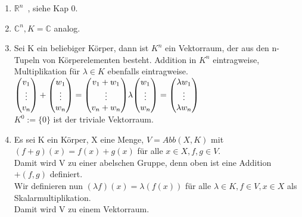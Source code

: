 \documentclass{article}
\newcommand{\lb}{\lambda}
\newcommand{\C}{\mathbb{C}}
\newcommand{\mRn}{$\mathbb{R}^n$\ }
\newcommand{\ve}[1]{{\begin{pmatrix}#1 \end{pmatrix}}}
\renewcommand{\v}{\ve}
\begin{document}
\begin{enumerate}
\item{\mRn, siehe Kap 0.}
\item{$\C^n, K = \C$ analog.}
\item{Sei K ein beliebiger Körper, dann ist $K^n$ ein Vektorraum, der aus den n-Tupeln von Körperelementen besteht. Addition in $K^n$ eintragweise, Multiplikation für $\lb \in K$ ebenfalls eintragweise.\\
$
\v{v_1\\ \vdots\\ v_n} + \v{w_1\\ \vdots\\ w_n} = \v{v_1 + w_1\\ \vdots \\ v_n + w_n}\\
\lb \v{w_1\\ \vdots\\ w_n} = \v{\lb w_1\\ \vdots \\ \lb w_n}
$\\
$K^0 := \{0\}$ ist der triviale Vektorraum.}
\item{Es sei K ein Körper, X eine Menge, $V = Abb(X, K)$ mit\\
$(f + g)(x) = f(x) + g(x)$ für alle $x \in X, f, g \in V$.\\
Damit wird V zu einer abelschen Gruppe, denn oben ist eine Addition $+(f, g)$ definiert.\\
Wir definieren nun $(\lb f)(x) = \lb (f(x))$ für alle $\lb \in K, f \in V, x \in X$ als Skalarmultiplikation.\\
Damit wird V zu einem Vektorraum.
}
\end{enumerate}
\end{document}
